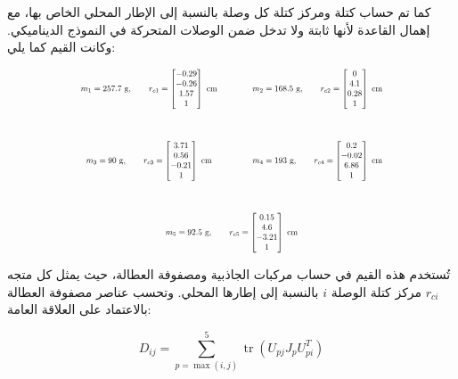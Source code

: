 كما تم حساب كتلة ومركز كتلة كل وصلة بالنسبة إلى الإطار المحلي الخاص بها، مع إهمال القاعدة لأنها ثابتة ولا تدخل ضمن الوصلات المتحركة في النموذج الديناميكي. وكانت القيم كما يلي:

\[
\resizebox{0.7\textwidth}{!}{$
\begin{array}{@{}c@{\hspace{1.5cm}}c@{}}

m_1 = 257.7 \ \text{g},
\qquad
r_{c1} =
\begin{bmatrix}
-0.29 \\
-0.26 \\
1.57 \\
1
\end{bmatrix}
\ \text{cm}
&
m_2 = 168.5 \ \text{g},
\qquad
r_{c2} =
\begin{bmatrix}
0 \\
4.1 \\
0.28 \\
1
\end{bmatrix}
\ \text{cm}
\\[2cm]

m_3 = 90 \ \text{g},
\qquad
r_{c3} =
\begin{bmatrix}
3.71 \\
0.56 \\
-0.21 \\
1
\end{bmatrix}
\ \text{cm}
&
m_4 = 193 \ \text{g},
\qquad
r_{c4} =
\begin{bmatrix}
0.2 \\
-0.02 \\
6.86 \\
1
\end{bmatrix}
\ \text{cm}
\\[2cm]

\multicolumn{2}{c}{
m_5 = 92.5 \ \text{g},
\qquad
r_{c5} =
\begin{bmatrix}
0.15 \\
4.6 \\
-3.21 \\
1
\end{bmatrix}
\ \text{cm}
}

\end{array}
$}
\]

تُستخدم هذه القيم في حساب مركبات الجاذبية ومصفوفة العطالة، حيث يمثل كل متجه $r_{ci}$ مركز كتلة الوصلة $i$ بالنسبة إلى إطارها المحلي.
وتحسب عناصر مصفوفة العطالة بالاعتماد على العلاقة العامة:

\begin{equation}
D_{ij}
=
\sum_{p=\max(i,j)}^{5}
\operatorname{tr}
\left(
U_{pj}J_pU_{pi}^{T}
\right)
\end{equation}

